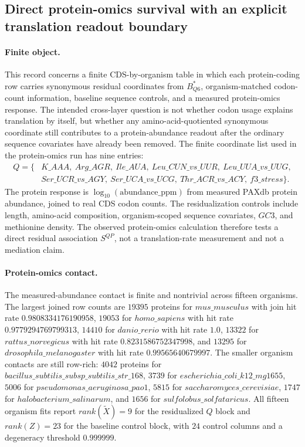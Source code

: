 \subsection{Direct protein-omics survival with an explicit translation readout boundary}
\label{sec:q6-direct-protein-omics-survival-translation-boundary}

\paragraph{Finite object.}
This record concerns a finite CDS-by-organism table in which each protein-coding row carries synonymous residual coordinates from $B^{*}_{Q6}$, organism-matched codon-count information, baseline sequence controls, and a measured protein-omics response.  The intended cross-layer question is not whether codon usage explains translation by itself, but whether any amino-acid-quotiented synonymous coordinate still contributes to a protein-abundance readout after the ordinary sequence covariates have already been removed.  The finite coordinate list used in the protein-omics run has nine entries:
$$
\begin{aligned}
Q = \{&K\_AAA,\ Arg\_AGR,\ Ile\_AUA,\ Leu\_CUN\_vs\_UUR,\ Leu\_UUA\_vs\_UUG,\\
&Ser\_UCR\_vs\_AGY,\ Ser\_UCA\_vs\_UCG,\ Thr\_ACR\_vs\_ACY,\ f3\_stress\}.
\end{aligned}
$$
The protein response is $\log_{10}(\mathrm{abundance\_ppm})$ from measured PAXdb protein abundance, joined to real CDS codon counts.  The residualization controls include length, amino-acid composition, organism-scoped sequence covariates, $GC3$, and methionine density.  The observed protein-omics calculation therefore tests a direct residual association $S^{QP}$, not a translation-rate measurement and not a mediation claim.

\paragraph{Protein-omics contact.}
The measured-abundance contact is finite and nontrivial across fifteen organisms.  The largest joined row counts are $19395$ proteins for $mus\_musculus$ with join hit rate $0.9808334176190958$, $19053$ for $homo\_sapiens$ with hit rate $0.9779294769799313$, $14410$ for $danio\_rerio$ with hit rate $1.0$, $13322$ for $rattus\_norvegicus$ with hit rate $0.8231586752347998$, and $13295$ for $drosophila\_melanogaster$ with hit rate $0.99565640679997$.  The smaller organism contacts are still row-rich: $4042$ proteins for $bacillus\_subtilis\_subsp\_subtilis\_str\_168$, $3739$ for $escherichia\_coli\_k12\_mg1655$, $5006$ for $pseudomonas\_aeruginosa\_pao1$, $5815$ for $saccharomyces\_cerevisiae$, $1747$ for $halobacterium\_salinarum$, and $1656$ for $sulfolobus\_solfataricus$.  All fifteen organism fits report $rank(\widetilde X)=9$ for the residualized $Q$ block and $rank(Z)=23$ for the baseline control block, with $24$ control columns and a degeneracy threshold $0.999999$.

